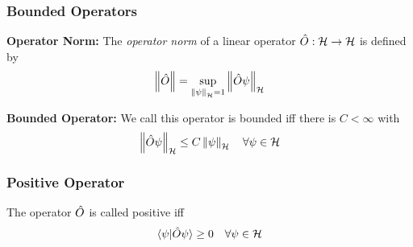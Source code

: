 \subsubsection{Bounded Operators}
\begin{definition}{\textbf{Operator Norm:}}
    The \emph{operator norm} of a linear operator $\hat{O}: \mathcal{H} \rightarrow \mathcal{H}$ is defined by 
    \begin{eqnarray}
        \left\lVert \hat{O} \right\rVert = \sup_{\left\lVert \psi \right\rVert_ {\mathcal{H}} = 1} \left\lVert \hat{O} \psi \right\rVert_ {\mathcal{H}}
    \end{eqnarray}
\end{definition}
\begin{definition}{\textbf{Bounded Operator:}}
    We call this operator is bounded iff there is $C< \infty$ with 
\begin{eqnarray}
    \left\lVert \hat{O} \psi \right\rVert_ {\mathcal{H}} \leq C \left\lVert \psi \right\rVert_ {\mathcal{H}} \quad \forall \psi \in \mathcal{H}
\end{eqnarray}
\end{definition}

\subsubsection{Positive Operator}
\begin{definition}
    The operator $\hat{O}$ is called positive iff 
    \begin{eqnarray}
        \braket{\psi | \hat{O} \psi} \geq 0 \quad \forall \psi \in \mathcal{H} \label{eq:positive_operator}
    \end{eqnarray}
\end{definition}
